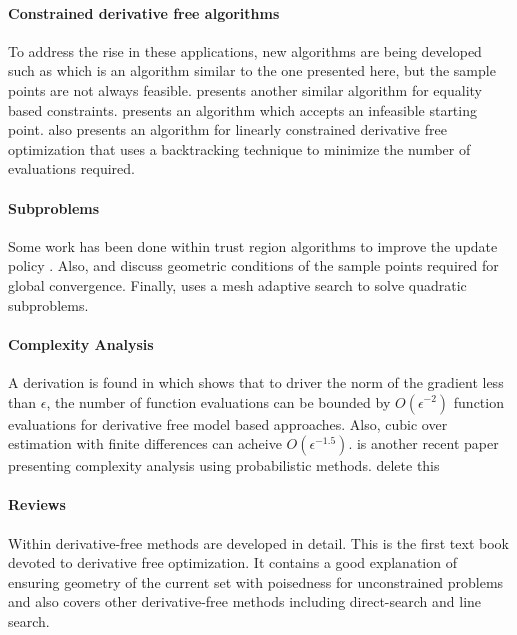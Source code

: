 \paragraph{Constrained derivative free algorithms}
To address the rise in these applications, new algorithms are being developed such as \cite{doi:10.1080/10556788.2015.1026968} which is an algorithm similar to the one presented here, but the sample points are not always feasible.
\cite{Troltzsch2016} presents another similar algorithm for equality based constraints.
\cite{infeasiblestarting} presents an algorithm which accepts an infeasible starting point.
\cite{Gao2018} also presents an algorithm for linearly constrained derivative free optimization that uses a backtracking technique to minimize the number of evaluations required.

\ifnum{}
\paragraph{Subproblems}
Some work has been done within trust region algorithms to improve the update policy \cite{Kamandi2017}.
Also, \cite{Verderio2017} and \cite{doi:10.1080/10556780802409296} discuss geometric conditions of the sample points required for global convergence.
Finally, \cite{AMAIOUA201813} uses a mesh adaptive search to solve quadratic subproblems.


\paragraph{Complexity Analysis}

A derivation is found in \cite{doi:10.1137/151005683} which shows that to driver the norm of the gradient less than $\epsilon$, the number of function evaluations can be bounded by $O(\epsilon^{-2})$ 
function evaluations for derivative free model based approaches. Also, cubic over estimation with finite differences can acheive $O(\epsilon^{-1.5})$. \cite{doi:10.1093/imanum/drx043} is another recent paper presenting complexity analysis using probabilistic methods.
\else
\color{red}
delete this
\color{black}
\fi
\paragraph{Reviews}
Within \cite{DUMMY:intro_book} derivative-free methods are developed in detail.
This is the first text book devoted to derivative free optimization.
It contains a good explanation of ensuring geometry of the current set with poisedness for unconstrained problems and also covers other derivative-free methods including direct-search and line search.

